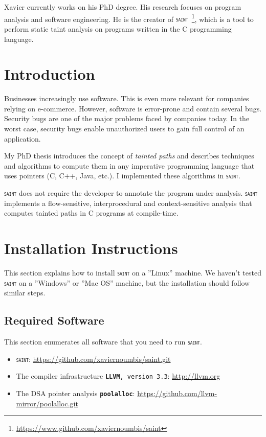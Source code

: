 \documentclass[11pt]{article} %
\newcommand{\saint}{\texttt{\textsc{saint}}\xspace}
\newcommand{\software}[2]{\texttt{\textbf{#1}, version #2}\xspace}
\newcommand{\softwarenov}[1]{\texttt{\textbf{#1}}\xspace}
\begin{document}
Xavier currently works on his PhD degree. His research focuses
on program analysis and software engineering. He is the creator
of \saint~\footnote{\url{https://www.github.com/xaviernoumbis/saint}}, which
is a tool to perform static taint analysis on programs written in the
C programming language.

\section{Introduction}
Businesses increasingly use software. This is even more
relevant for companies relying on e-commerce. However,
software is error-prone and contain several bugs. Security
bugs are one of the major problems faced by companies today.
In the worst case, security bugs enable unauthorized users
to gain full control of an application.

My PhD thesis introduces the concept of 
\textcolor{firebrickred}{\textit{tainted paths}} and
describes techniques and algorithms to compute them in
any imperative programming language that uses
pointers (C, C++, Java, etc.). I implemented these
algorithms in \saint.

\saint does not require the developer to annotate
the program under analysis. \saint implements a
flow-sensitive, interprocedural and context-sensitive
analysis that computes tainted paths in C programs
at compile-time.

\section{Installation Instructions}
This section explains how to install \saint on a ''Linux'' machine.
We haven't tested \saint on a ''Windows'' or ''Mac OS'' machine,
but the installation should follow similar steps. 

\subsection{Required Software}
This section enumerates all software that you need to run \saint.
\begin{itemize}
	\item \saint: \url{https://github.com/xaviernoumbis/saint.git}
	
	\item The compiler infrastructure \software{LLVM}{3.3}: \url{http://llvm.org}
	
	\item The DSA pointer analysis \softwarenov{poolalloc}:
	\url{https://github.com/llvm-mirror/poolalloc.git}
\end{itemize}
\end{document}
